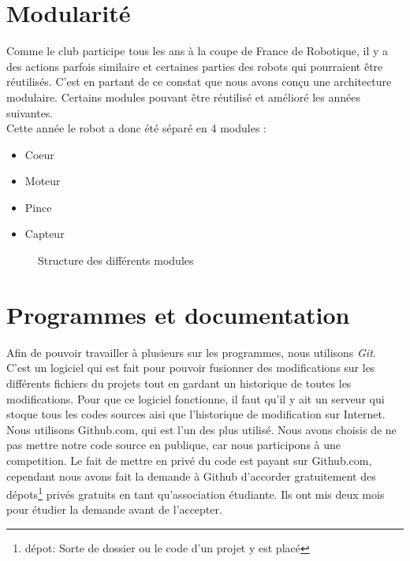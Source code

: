 \newpage
\section{Modularité}
Comme le club participe tous les ans à la coupe de France de Robotique, il y a des actions parfois similaire et certaines parties des robots qui pourraient être réutilisés. C'est en partant de ce constat que nous avons conçu une architecture modulaire. Certains modules pouvant être réutilisé et amélioré les années suivantes. \\


Cette année le robot a donc été séparé en 4 modules :

\begin{itemize}
	\item Coeur
	\item Moteur
	\item Pince 
	\item Capteur
\end{itemize}


\begin{figure}[h]
	\centering
	
	\caption{Structure des différents modules}
\end{figure}

\section{Programmes et documentation}
Afin de pouvoir travailler à plusieurs sur les programmes, nous utilisons \textit{Git}. C'est un logiciel qui est fait pour pouvoir fusionner des modifications sur les différents fichiers du projets tout en gardant un historique de toutes les modifications. Pour que ce logiciel fonctionne, il faut qu'il y ait un serveur qui stoque tous les codes sources aisi que l'historique de modification sur Internet.\\

Nous utilisons Github.com, qui est l'un des plus utilisé. Nous avons choisis de ne pas mettre notre code source en publique, car nous participons à une competition. Le fait de mettre en privé du code est payant sur Github.com, cependant nous avons fait la demande à Github d'accorder gratuitement des dépots\footnote{dépot: Sorte de dossier ou le code d'un projet y est placé}  privés gratuits en tant qu'association étudiante. Ils ont mis deux mois pour étudier la demande avant de l'accepter.\\

\newpage

